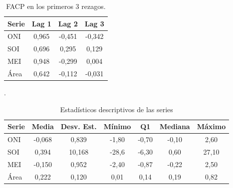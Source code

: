 \begin{table}[H]
    \centering
    \caption{FACP en los primeros 3 rezagos.}
    \label{tab:facp}
    \begin{tabular}{lccc}
        \toprule
        \textbf{Serie} & \textbf{Lag 1} & \textbf{Lag 2} & \textbf{Lag 3} \\
        \midrule
        ONI  & 0,965 & -0,451 & -0,342 \\
        SOI  & 0,696 &  0,295 &  0,129 \\
        MEI  & 0,948 & -0,299 &  0,004 \\
        Área & 0,642 & -0,112 & -0,031 \\
        \bottomrule
    \end{tabular}
\end{table}


\begin{table}[H]
    \centering
    \caption{Estadísticos descriptivos de las series}.
    \label{tab:descriptivos}
    \begin{tabular}{lcccccc}
        \toprule
        Serie & Media & Desv. Est. & Mínimo & Q1 & Mediana & Máximo \\
        \midrule
        ONI   & -0,068 & 0,839 & -1,80 & -0,70 & -0,10 &  2,60 \\
        SOI   &  0,394 & 10,168 & -28,6 & -6,30 &  0,60 & 27,10 \\
        MEI   & -0,150 & 0,952 & -2,40 & -0,87 & -0,22 &  2,50 \\
        Área  &  0,222 & 0,120 &  0,01 &  0,14 &  0,19 &  0,82 \\
        \bottomrule
    \end{tabular}
\end{table}



